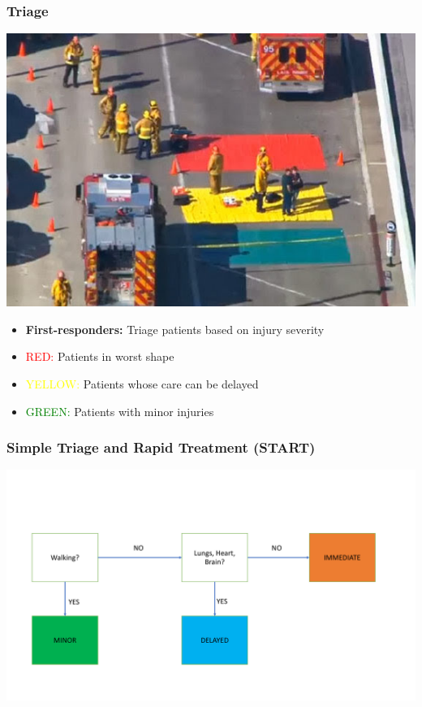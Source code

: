 \documentclass{beamer}
\begin{document}
\begin{frame}
  \frametitle{Triage}
  \begin{minipage}[c]{.45\textwidth}
    \includegraphics[width=1\textwidth]{EMSTriage}
  \end{minipage}
  \begin{minipage}[c]{.45\textwidth}
    \begin{itemize}
      \item \textbf{First-responders:} Triage patients based on injury severity
      \item \textcolor{red}{RED:} Patients in worst shape
      \item \textcolor{yellow}{YELLOW:} Patients whose care can be delayed
      \item \textcolor{green}{GREEN:} Patients with minor injuries
    \end{itemize}
  \end{minipage}
\end{frame}

\begin{frame}
  \frametitle{Simple Triage and Rapid Treatment (START)}
  \centering
  \includegraphics[width=1\textwidth]{Start}
\end{frame}
\end{document}
